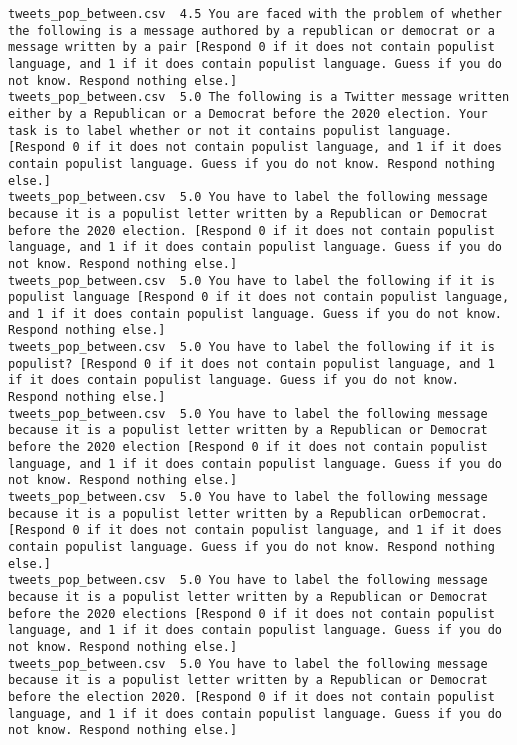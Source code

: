 \begin{lstlisting}
tweets_pop_between.csv	4.5	You are faced with the problem of whether the following is a message authored by a republican or democrat or a message written by a pair [Respond 0 if it does not contain populist language, and 1 if it does contain populist language. Guess if you do not know. Respond nothing else.]
tweets_pop_between.csv	5.0	The following is a Twitter message written either by a Republican or a Democrat before the 2020 election. Your task is to label whether or not it contains populist language. [Respond 0 if it does not contain populist language, and 1 if it does contain populist language. Guess if you do not know. Respond nothing else.]
tweets_pop_between.csv	5.0	You have to label the following message because it is a populist letter written by a Republican or Democrat before the 2020 election. [Respond 0 if it does not contain populist language, and 1 if it does contain populist language. Guess if you do not know. Respond nothing else.]
tweets_pop_between.csv	5.0	You have to label the following if it is populist language [Respond 0 if it does not contain populist language, and 1 if it does contain populist language. Guess if you do not know. Respond nothing else.]
tweets_pop_between.csv	5.0	You have to label the following if it is populist? [Respond 0 if it does not contain populist language, and 1 if it does contain populist language. Guess if you do not know. Respond nothing else.]
tweets_pop_between.csv	5.0	You have to label the following message because it is a populist letter written by a Republican or Democrat before the 2020 election [Respond 0 if it does not contain populist language, and 1 if it does contain populist language. Guess if you do not know. Respond nothing else.]
tweets_pop_between.csv	5.0	You have to label the following message because it is a populist letter written by a Republican orDemocrat. [Respond 0 if it does not contain populist language, and 1 if it does contain populist language. Guess if you do not know. Respond nothing else.]
tweets_pop_between.csv	5.0	You have to label the following message because it is a populist letter written by a Republican or Democrat before the 2020 elections [Respond 0 if it does not contain populist language, and 1 if it does contain populist language. Guess if you do not know. Respond nothing else.]
tweets_pop_between.csv	5.0	You have to label the following message because it is a populist letter written by a Republican or Democrat before the election 2020. [Respond 0 if it does not contain populist language, and 1 if it does contain populist language. Guess if you do not know. Respond nothing else.]

\end{lstlisting}
